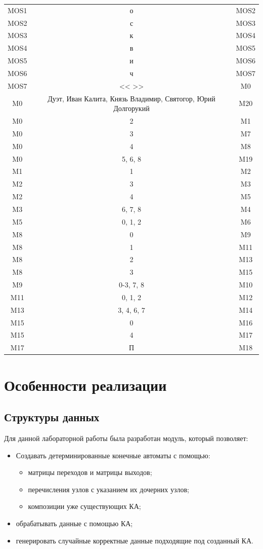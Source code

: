 \documentclass[a4paper,final]{article}
\begin{document}
\begin{longtable}{|c|c|c|}
MOS1 & о & MOS2 \\
MOS2 & с & MOS3 \\
MOS3 & к & MOS4 \\
MOS4 & в & MOS5 \\
MOS5 & и & MOS6 \\
MOS6 & ч & MOS7 \\
MOS7 & << >> & M0 \\
M0 & \parbox{7cm}{Дуэт, Иван Калита, Князь Владимир, Святогор, Юрий Долгорукий} & M20 \\
M0 & 2 & M1 \\
M0 & 3 & M7 \\
M0 & 4 & M8 \\
M0 & 5, 6, 8 & M19 \\
M1 & 1 & M2 \\
M2 & 3 & M3 \\
M2 & 4 & M5 \\
M3 & 6, 7, 8 & M4 \\
M5 & 0, 1, 2 & M6 \\
M8 & 0 & M9 \\
M8 & 1 & M11 \\
M8 & 2 & M13 \\
M8 & 3 & M15 \\
M9 & 0-3, 7, 8 & M10 \\
M11 & 0, 1, 2 & M12 \\
M13 & 3, 4, 6, 7 & M14 \\
M15 & 0 & M16 \\
M15 & 4 & M17 \\
M17 & П & M18 \\

\end{longtable}

\newpage
\section{Особенности реализации}
\subsection{Структуры данных}
Для данной лабораторной работы была разработан модуль, который позволяет:
\begin{itemize}
    \item Создавать детерминированные конечные автоматы с помощью:
    \begin{itemize}
        \item матрицы переходов и матрицы выходов;
        \item перечисления узлов с указанием их дочерних узлов;
        \item композиции уже существующих КА;
    \end{itemize}
    \item обрабатывать данные с помощью КА;
    \item генерировать случайные корректные данные подходящие под созданный КА.
\end{itemize}
\end{document}
